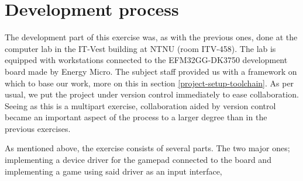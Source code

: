 \section{Development process}

The development part of this exercise was, as with the previous ones, done at the computer lab in the IT-Vest building at NTNU (room ITV-458). The lab is equipped with workstations connected to the EFM32GG-DK3750 development board made by Energy Micro.
The subject staff provided us with a framework on which to base our work, more on this in section \ref{project-setup-toolchain}.
As per usual, we put the project under version control immediately to ease collaboration. Seeing as this is a multipart exercise, collaboration aided by version control became an important aspect of the process to a larger degree than in the previous exercises.

As mentioned above, the exercise consists of several parts. The two major ones; implementing a device driver for the gamepad connected to the board and implementing a game using said driver as an input interface, 

